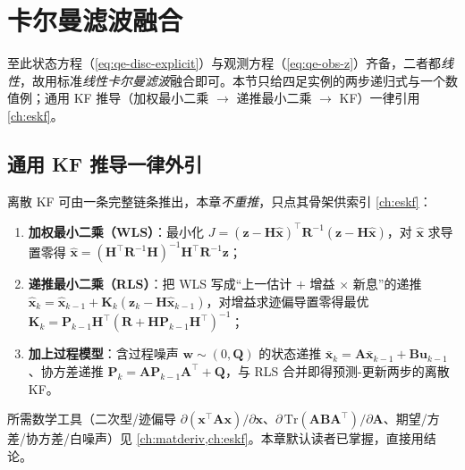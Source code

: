 \section{卡尔曼滤波融合}
\label{sec:qe-kf}

至此状态方程（\cref{eq:qe-disc-explicit}）与观测方程（\cref{eq:qe-obs-z}）齐备，二者都\emph{线性}，故用标准\emph{线性卡尔曼滤波}融合即可。本节只给四足实例的两步递归式与一个数值例；通用 KF 推导（加权最小二乘 $\to$ 递推最小二乘 $\to$ KF）一律引用 \cref{ch:eskf}。

\subsection{通用 KF 推导一律外引}
\label{subsec:qe-kf-cite}

\begin{derivation}\label{deriv:qe-kf-lineage}
离散 KF 可由一条完整链条推出，本章\emph{不重推}，只点其骨架供索引 \cref{ch:eskf}：
\begin{enumerate}
  \item \textbf{加权最小二乘（WLS）}：最小化 $J=(\boldsymbol z-\mathbf{H}\hat{\boldsymbol x})^\top\mathbf{R}^{-1}(\boldsymbol z-\mathbf{H}\hat{\boldsymbol x})$，对 $\hat{\boldsymbol x}$ 求导置零得 $\hat{\boldsymbol x}=(\mathbf{H}^\top\mathbf{R}^{-1}\mathbf{H})^{-1}\mathbf{H}^\top\mathbf{R}^{-1}\boldsymbol z$；
  \item \textbf{递推最小二乘（RLS）}：把 WLS 写成“上一估计 $+$ 增益 $\times$ 新息”的递推 $\hat{\boldsymbol x}_k=\hat{\boldsymbol x}_{k-1}+\mathbf{K}_k(\boldsymbol z_k-\mathbf{H}\hat{\boldsymbol x}_{k-1})$，对增益求迹偏导置零得最优 $\mathbf{K}_k=\mathbf{P}_{k-1}\mathbf{H}^\top(\mathbf{R}+\mathbf{H}\mathbf{P}_{k-1}\mathbf{H}^\top)^{-1}$；
  \item \textbf{加上过程模型}：含过程噪声 $\boldsymbol w\sim(0,\mathbf{Q})$ 的状态递推 $\bar{\boldsymbol x}_k=\mathbf{A}\bar{\boldsymbol x}_{k-1}+\mathbf{B}\boldsymbol u_{k-1}$、协方差递推 $\mathbf{P}_k=\mathbf{A}\mathbf{P}_{k-1}\mathbf{A}^\top+\mathbf{Q}$，与 RLS 合并即得预测-更新两步的离散 KF。
\end{enumerate}
所需数学工具（二次型/迹偏导 $\partial(\boldsymbol x^\top\mathbf{A}\boldsymbol x)/\partial\boldsymbol x$、$\partial\,\mathrm{Tr}(\mathbf{A}\mathbf{B}\mathbf{A}^\top)/\partial\mathbf{A}$、期望/方差/协方差/白噪声）见 \cref{ch:matderiv,ch:eskf}。本章默认读者已掌握，直接用结论。
\end{derivation}

